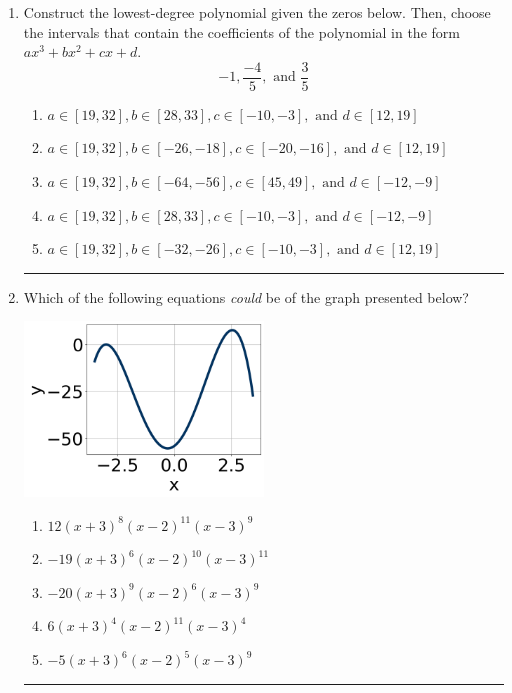 \documentclass[14pt]{extbook}
\newcommand{\litem}[1]{\item#1\hspace*{-1cm}\rule{\textwidth}{0.4pt}}
\begin{document}
\begin{enumerate}
{\begin{enumerate}[label=\Alph*.]
\end{enumerate} }
\litem{
Construct the lowest-degree polynomial given the zeros below. Then, choose the intervals that contain the coefficients of the polynomial in the form $ax^3+bx^2+cx+d$.\[ -1, \frac{-4}{5}, \text{ and } \frac{3}{5} \]\begin{enumerate}[label=\Alph*.]
\item \( a \in [19, 32], b \in [28, 33], c \in [-10, -3], \text{ and } d \in [12, 19] \)
\item \( a \in [19, 32], b \in [-26, -18], c \in [-20, -16], \text{ and } d \in [12, 19] \)
\item \( a \in [19, 32], b \in [-64, -56], c \in [45, 49], \text{ and } d \in [-12, -9] \)
\item \( a \in [19, 32], b \in [28, 33], c \in [-10, -3], \text{ and } d \in [-12, -9] \)
\item \( a \in [19, 32], b \in [-32, -26], c \in [-10, -3], \text{ and } d \in [12, 19] \)

\end{enumerate} }
\litem{
Which of the following equations \textit{could} be of the graph presented below?
\begin{center}
    \includegraphics[width=0.5\textwidth]{../Figures/polyGraphToFunctionCopyB.png}
\end{center}
\begin{enumerate}[label=\Alph*.]
\item \( 12(x + 3)^{8} (x - 2)^{11} (x - 3)^{9} \)
\item \( -19(x + 3)^{6} (x - 2)^{10} (x - 3)^{11} \)
\item \( -20(x + 3)^{9} (x - 2)^{6} (x - 3)^{9} \)
\item \( 6(x + 3)^{4} (x - 2)^{11} (x - 3)^{4} \)
\item \( -5(x + 3)^{6} (x - 2)^{5} (x - 3)^{9} \)

\end{enumerate} }
\end{enumerate}
\end{document}
